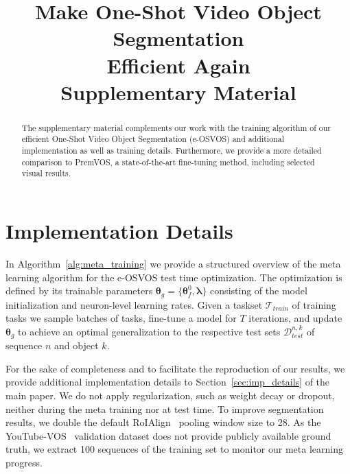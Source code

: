 \documentclass{article}
\newif\ifarxiv
\begin{document}
\ifarxiv
    \setcounter{section}{0}
    \setcounter{figure}{0}
    \setcounter{table}{0}
    \setcounter{equation}{0}
    \setcounter{footnote}{0}

    \title{Make One-Shot Video Object Segmentation \\ Efficient Again \\ {\normalfont Supplementary Material}}
    \clearpage
    \maketitle
    \let\maketitle\relax

    \begin{abstract}
The supplementary material complements our work with the training algorithm of our efficient One-Shot Video Object Segmentation (e-OSVOS) and additional implementation as well as training details.
Furthermore, we provide a more detailed comparison to PremVOS, a state-of-the-art fine-tuning method, including selected visual results.
\end{abstract}

\section{Implementation Details}

    In Algorithm~\ref{alg:meta_training} we provide a structured overview of the meta learning algorithm for the e-OSVOS test time optimization.
The optimization is defined by its trainable parameters $\boldsymbol \theta_g = \{\boldsymbol \theta_f^0, \boldsymbol \lambda\}$ consisting of the model initialization and neuron-level learning rates.
Given a taskset $\mathcal{T}_{train}$ of training tasks we sample batches of tasks, fine-tune a model for $T$ iterations, and update $\boldsymbol \theta_g$ to achieve an optimal generalization to the respective test sets $\mathcal{D}_{test}^{n,k}$ of sequence $n$ and object $k$.

    For the sake of completeness and to facilitate the reproduction of our results, we provide additional implementation details to Section~\ref{sec:imp_details} of the main paper.
We do not apply regularization, such as weight decay or dropout, neither during the meta training nor at test time.
To improve segmentation results, we double the default RoIAlign~\cite{MaskRCNN} pooling window size to 28.
As the YouTube-VOS~\cite{Xu2018YouTubeVOSAL} validation dataset does not provide publicly available ground truth, we extract 100 sequences of the training set to monitor our meta learning progress.
\end{document}
